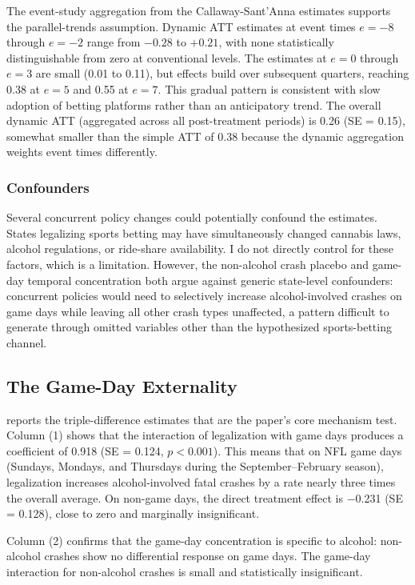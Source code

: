 \documentclass[12pt]{article}
\begin{document}
The event-study aggregation from the Callaway-Sant'Anna estimates supports the parallel-trends assumption. Dynamic ATT estimates at event times $e = -8$ through $e = -2$ range from $-0.28$ to $+0.21$, with none statistically distinguishable from zero at conventional levels. The estimates at $e = 0$ through $e = 3$ are small (0.01 to 0.11), but effects build over subsequent quarters, reaching 0.38 at $e = 5$ and 0.55 at $e = 7$. This gradual pattern is consistent with slow adoption of betting platforms rather than an anticipatory trend. The overall dynamic ATT (aggregated across all post-treatment periods) is 0.26 (SE = 0.15), somewhat smaller than the simple ATT of 0.38 because the dynamic aggregation weights event times differently.

\subsubsection*{Confounders} Several concurrent policy changes could potentially confound the estimates. States legalizing sports betting may have simultaneously changed cannabis laws, alcohol regulations, or ride-share availability. I do not directly control for these factors, which is a limitation. However, the non-alcohol crash placebo and game-day temporal concentration both argue against generic state-level confounders: concurrent policies would need to selectively increase alcohol-involved crashes on game days while leaving all other crash types unaffected, a pattern difficult to generate through omitted variables other than the hypothesized sports-betting channel.

\subsection{The Game-Day Externality}



 reports the triple-difference estimates that are the paper's core mechanism test. Column (1) shows that the interaction of legalization with game days produces a coefficient of 0.918 (SE = 0.124, $p < 0.001$). This means that on NFL game days (Sundays, Mondays, and Thursdays during the September--February season), legalization increases alcohol-involved fatal crashes by a rate nearly three times the overall average. On non-game days, the direct treatment effect is $-$0.231 (SE = 0.128), close to zero and marginally insignificant.

Column (2) confirms that the game-day concentration is specific to alcohol: non-alcohol crashes show no differential response on game days. The game-day interaction for non-alcohol crashes is small and statistically insignificant.
\end{document}
